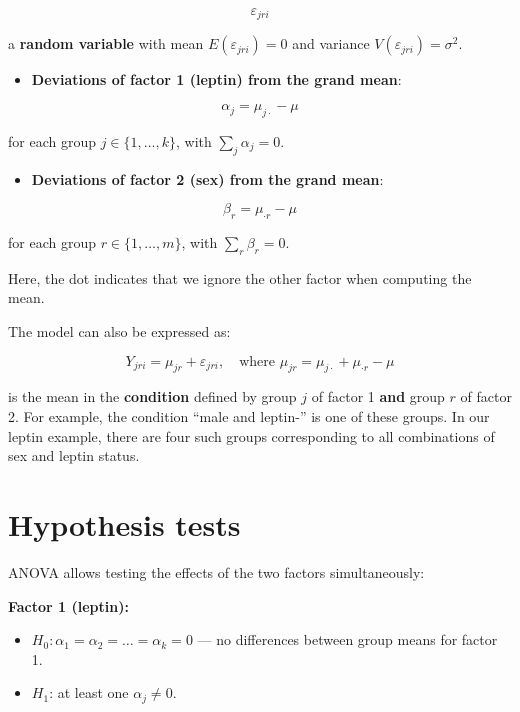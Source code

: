 \documentclass[
]{book}
\providecommand{\tightlist}{%
  \setlength{\itemsep}{0pt}\setlength{\parskip}{0pt}}
\begin{document}
\[
\varepsilon_{jri}
\]

a \textbf{random variable} with mean \(E(\varepsilon_{jri}) = 0\) and variance \(V(\varepsilon_{jri}) = \sigma^2\).

\begin{itemize}
\tightlist
\item
  \textbf{Deviations of factor 1 (leptin) from the grand mean}:
\end{itemize}

\[
\alpha_j = \mu_{j\cdot} - \mu
\]

for each group \(j \in \{1, \dots, k\}\), with \(\sum_j \alpha_j = 0\).

\begin{itemize}
\tightlist
\item
  \textbf{Deviations of factor 2 (sex) from the grand mean}:
\end{itemize}

\[
\beta_r = \mu_{\cdot r} - \mu
\]

for each group \(r \in \{1, \dots, m\}\), with \(\sum_r \beta_r = 0\).

Here, the dot indicates that we ignore the other factor when computing the mean.

The model can also be expressed as:

\[
Y_{jri} = \mu_{jr} + \varepsilon_{jri}, \quad \text{where } \mu_{jr} = \mu_{j\cdot} + \mu_{\cdot r} - \mu
\]

is the mean in the \textbf{condition} defined by group \(j\) of factor 1 \textbf{and} group \(r\) of factor 2. For example, the condition ``male and leptin-'' is one of these groups. In our leptin example, there are four such groups corresponding to all combinations of sex and leptin status.

\hypertarget{hypothesis-tests}{%
\section{Hypothesis tests}\label{hypothesis-tests}}

ANOVA allows testing the effects of the two factors simultaneously:

\textbf{Factor 1 (leptin):}

\begin{itemize}
\tightlist
\item
  \(H_0: \alpha_1 = \alpha_2 = \dots = \alpha_k = 0\) --- no differences between group means for factor 1.
\item
  \(H_1\): at least one \(\alpha_j \neq 0\).
\end{itemize}
\end{document}
